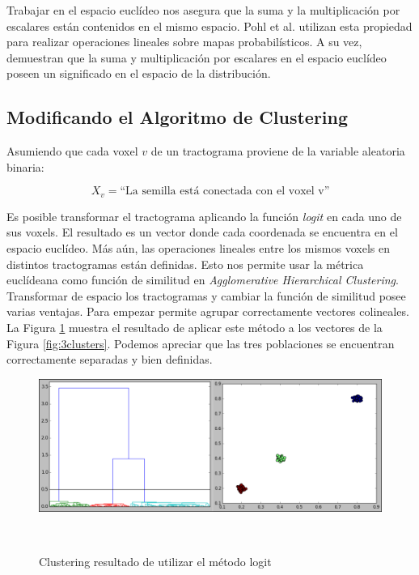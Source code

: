 Trabajar en el espacio eucl\'ideo nos asegura que la suma y la multiplicaci\'on
por escalares est\'an contenidos en el mismo espacio. Pohl et al. \cite{Pohl2007} 
utilizan esta propiedad para realizar operaciones lineales sobre mapas
probabil\'isticos. A su vez, demuestran que la suma y multiplicaci\'on
por escalares en el espacio eucl\'ideo poseen un significado en el espacio de la
distribuci\'on. \\

\subsection{Modificando el Algoritmo de Clustering}

Asumiendo que cada voxel $v$ de un tractograma proviene de la variable 
aleatoria binaria:

 $$X_v= \textrm{``La semilla est\'a conectada con el voxel v''}$$
 
Es posible transformar el tractograma aplicando la funci\'on \textit{logit} en
cada uno de sus voxels. El resultado es un vector donde cada coordenada se 
encuentra en el espacio eucl\'ideo.  M\'as a\'un, las operaciones lineales entre
los mismos voxels en distintos tractogramas est\'an definidas. Esto nos permite
usar la m\'etrica eucl\'ideana como funci\'on de similitud en \textit{Agglomerative
Hierarchical Clustering}. \\

Transformar de espacio los tractogramas y cambiar la funci\'on de similitud 
posee varias ventajas. Para empezar permite agrupar correctamente vectores
colineales. La Figura \ref{fig:3logit} muestra el resultado de aplicar este
m\'etodo a los vectores de la Figura \ref{fig:3clusters}.  Podemos apreciar 
que las tres poblaciones se encuentran correctamente separadas y bien definidas.\\

\begin{figure}[h!]

\centering
\begin{minipage}[b]{0.85\textwidth}
    \includegraphics[width=\textwidth]{img/3pop_logit.png}
    \caption{Clustering resultado de utilizar el m\'etodo logit}
    \label{fig:3logit}
\end{minipage} ~

\end{figure}  

